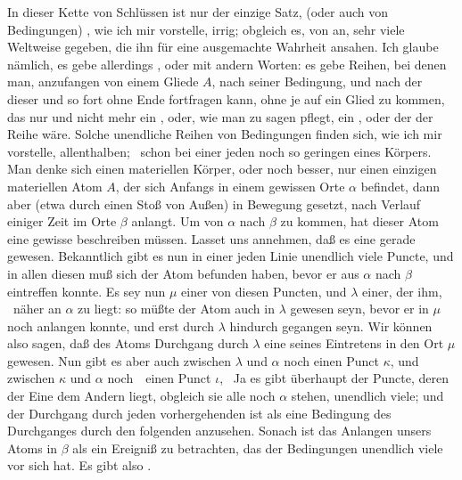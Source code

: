 \begin{aufza}
\item In dieser Kette von Schlüssen ist nur der einzige Satz,  (oder auch von Bedingungen) , wie ich mir vorstelle, irrig; obgleich es, von  an, sehr viele Weltweise gegeben, die ihn für eine ausgemachte Wahrheit ansahen. Ich glaube nämlich, es gebe allerdings , oder mit andern Worten: es gebe Reihen, bei denen man, anzufangen von einem Gliede $A$, nach seiner Bedingung, und nach der  dieser  und so fort ohne Ende fortfragen kann, ohne je auf ein Glied zu kommen, das nur  und nicht mehr ein , oder, wie man zu sagen pflegt, ein , oder der  der Reihe wäre. Solche unendliche Reihen von Bedingungen finden sich, wie ich mir vorstelle, allenthalben; \zB\ schon bei einer jeden noch so geringen  eines Körpers. Man denke sich einen materiellen Körper, oder noch besser, nur einen einzigen materiellen Atom $A$, der sich Anfangs in einem gewissen Orte $\alpha$ befindet, dann aber (etwa durch einen Stoß von Außen) in Bewegung gesetzt, nach Verlauf einiger Zeit im Orte $\beta$ anlangt. Um von $\alpha$ nach $\beta$ zu kommen, hat dieser Atom eine gewisse  beschreiben müssen. Lasset uns annehmen, daß es eine gerade gewesen. Bekanntlich gibt es nun in einer jeden Linie unendlich viele Puncte, und in allen diesen muß sich der Atom befunden haben, bevor er aus $\alpha$ nach $\beta$ eintreffen konnte. Es sey nun $\mu$ einer von diesen Puncten, und $\lambda$ einer, der  ihm, \dh\ näher an $\alpha$ zu liegt: so müßte der Atom auch in $\lambda$ gewesen seyn, bevor er in $\mu$ noch anlangen konnte, und erst durch $\lambda$ hindurch gegangen seyn. Wir können also sagen, daß des Atoms Durchgang durch $\lambda$ eine  seines Eintretens in den Ort $\mu$ gewesen. Nun gibt es aber auch zwischen $\lambda$ und $\alpha$ noch einen Punct $\kappa$, und zwischen $\kappa$ und $\alpha$ noch~\ einen Punct $\iota$, \usw\ Ja es gibt überhaupt der Puncte, deren der Eine  dem Andern liegt, obgleich sie alle noch  $\alpha$ stehen, unendlich viele; und der Durchgang durch jeden vorhergehenden ist als eine Bedingung des Durchganges durch den folgenden anzusehen. Sonach ist das Anlangen unsers Atoms in $\beta$ als ein Ereigniß zu betrachten, das der Bedingungen unendlich viele vor sich hat. Es gibt also .

\end{aufza}
